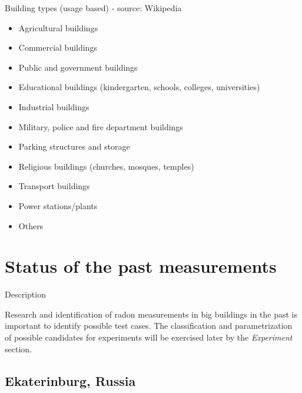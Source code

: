 \documentclass[xcolor=svgnames]{beamer}
\newcommand{\1}{\'{\i}}
\begin{document}
\begin{frame}{Building types (usage based) - source: Wikipedia}
\begin{itemize}

\item Agricultural buildings
\item Commercial buildings 
\item Public and government buildings 
\item Educational buildings (kindergarten, schools, colleges, universities)
\item Industrial buildings
\item Military, police and fire department buildings
\item Parking structures and storage
\item Religious buildings (churches, mosques, temples)
\item Transport buildings
\item Power stations/plants
\item Others

\end{itemize}


\end{frame}


\section[Measurements]{Status of the past measurements}

\frame{\tableofcontents[currentsection]}

\begin{frame}{Description}

Research and identification of radon measurements in big buildings in the past is important to identify possible test cases. The classification and parametrization of possible candidates for experiments will be exercised later by the \textit{Experiment} section.

\end{frame}

\subsection{Ekaterinburg, Russia}
\end{document}
